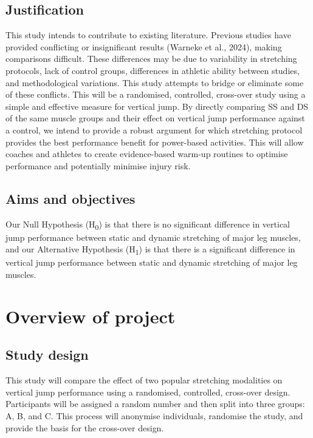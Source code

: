\documentclass[stu, floatsintext, a4paper]{apa7}
\begin{document}
\subsection{Justification}
\label{sec:org31d862a}

This study intends to contribute to existing literature. Previous studies have provided conflicting or insignificant results (Warneke et al., 2024), making comparisons difficult. These differences may be due to variability in stretching protocols, lack of control groups, differences in athletic ability between studies, and methodological variations. This study attempts to bridge or eliminate some of these conflicts. This will be a randomised, controlled, cross-over study using a simple and effective measure for vertical jump. By directly comparing SS and DS of the same muscle groups and their effect on vertical jump performance against a control, we intend to provide a robust argument for which stretching protocol provides the best performance benefit for power-based activities. This will allow coaches and athletes to create evidence-based warm-up routines to optimise performance and potentially minimise injury risk.

\subsection{Aims and objectives}
\label{sec:org15988ee}

Our Null Hypothesis (H\textsubscript{0}) is that there is no significant difference in vertical jump performance between static and dynamic stretching of major leg muscles, and our Alternative Hypothesis (H\textsubscript{1}) is that there is a significant difference in vertical jump performance between static and dynamic stretching of major leg muscles.
\section{Overview of project}
\label{sec:orgec4cc67}

\subsection{Study design}
\label{sec:orgc824e27}

This study will compare the effect of two popular stretching modalities on vertical jump performance using a randomised, controlled, cross-over design.
Participants will be assigned a random number and then split into three groups: A, B, and C. This process will anonymise individuals, randomise the study, and provide the basis for the cross-over design.
\end{document}
